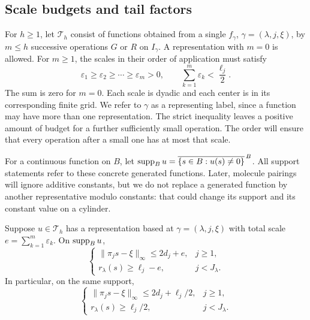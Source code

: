 \subsection{Scale budgets and tail factors}

For \(h\geq1\), let \(\mathcal T_h\) consist of functions obtained
from a single \(f_\gamma\), \(\gamma=(\lambda,j,\xi)\), by \(m\leq h\)
successive operations \(G\) or \(R\) on \(I_\gamma\). A representation
with \(m=0\) is allowed. For \(m\geq1\), the scales in their order of
application must satisfy
\begin{equation}
 \varepsilon_1\geq\varepsilon_2\geq\cdots\geq\varepsilon_m>0,
 \qquad
 \sum_{k=1}^m\varepsilon_k<\frac{\ell_j}{2}.                 \label{eq:scale-rule}
\end{equation}
The sum is zero for \(m=0\). Each scale is dyadic and each center is
in its corresponding finite grid. We refer to \(\gamma\) as a
representing label, since a function may have more than one
representation. The strict inequality leaves a positive amount of
budget for a further sufficiently small operation. The order will
ensure that every operation after a small one has at most that scale.

For a continuous function on \(B\), let
\(\operatorname{supp}_B u=\overline{\{s\in B:u(s)\ne0\}}^{\,B}\).
All support statements refer to these concrete generated functions.
Later, molecule pairings will ignore additive constants, but we do not
replace a generated function by another representative modulo constants:
that could change its support and its constant value on a cylinder.

\begin{lemma}\label{lem:support}
Suppose \(u\in\mathcal T_h\) has a representation based at
\(\gamma=(\lambda,j,\xi)\) with total scale
\(e=\sum_{k=1}^m\varepsilon_k\). On \(\operatorname{supp}_B u\),
\begin{equation}
 \begin{cases}
 \|\pi_j s-\xi\|_\infty\leq2d_j+e,&j\geq1,\\
 r_\lambda(s)\geq\ell_j-e,&j<J_\lambda.
 \end{cases}                                                  \label{eq:support-sharp}
\end{equation}
In particular, on the same support,
\begin{equation}
 \begin{cases}
 \|\pi_j s-\xi\|_\infty\leq2d_j+\ell_j/2,&j\geq1,\\
 r_\lambda(s)\geq\ell_j/2,&j<J_\lambda.
 \end{cases}                                                  \label{eq:support-coarse}
\end{equation}
\end{lemma}

